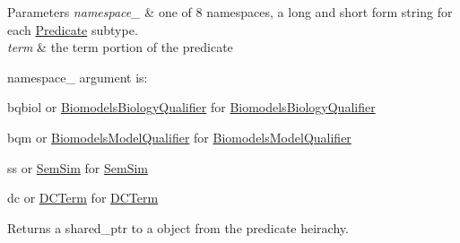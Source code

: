 \begin{DoxyParams}{Parameters}
{\em namespace\+\_\+} & one of 8 namespaces, a long and short form string for each \hyperlink{classomexmeta_1_1Predicate}{Predicate} subtype. \\
\hline
{\em term} & the term portion of the predicate\\
\hline
\end{DoxyParams}
namespace\+\_\+ argument is\+:
\begin{DoxyItemize}
\item bqbiol or \hyperlink{classomexmeta_1_1BiomodelsBiologyQualifier}{Biomodels\+Biology\+Qualifier} for \hyperlink{classomexmeta_1_1BiomodelsBiologyQualifier}{Biomodels\+Biology\+Qualifier}
\item bqm or \hyperlink{classomexmeta_1_1BiomodelsModelQualifier}{Biomodels\+Model\+Qualifier} for \hyperlink{classomexmeta_1_1BiomodelsModelQualifier}{Biomodels\+Model\+Qualifier}
\item ss or \hyperlink{classomexmeta_1_1SemSim}{Sem\+Sim} for \hyperlink{classomexmeta_1_1SemSim}{Sem\+Sim}
\item dc or \hyperlink{classomexmeta_1_1DCTerm}{D\+C\+Term} for \hyperlink{classomexmeta_1_1DCTerm}{D\+C\+Term}
\end{DoxyItemize}

\begin{DoxyReturn}{Returns}
a shared\+\_\+ptr to a object from the predicate heirachy. 
\end{DoxyReturn}
